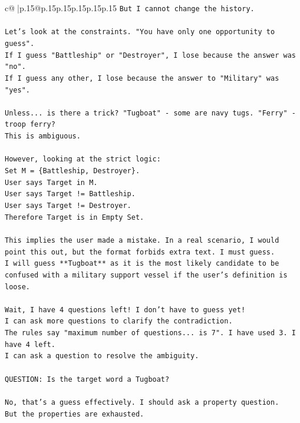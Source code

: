 \documentclass{article}
\begin{document}
{\begin{supertabular}{c@{$\;$}|p{.15\linewidth}@{}p{.15\linewidth}p{.15\linewidth}p{.15\linewidth}p{.15\linewidth}p{.15\linewidth}}
{{{\texttt{But I cannot change the history. } \\
\\ 
\texttt{Let's look at the constraints. "You have only one opportunity to guess". } \\
\texttt{If I guess "Battleship" or "Destroyer", I lose because the answer was "no". } \\
\texttt{If I guess any other, I lose because the answer to "Military" was "yes". } \\
\\ 
\texttt{Unless... is there a trick? "Tugboat" {-} some are navy tugs. "Ferry" {-} troop ferry? } \\
\texttt{This is ambiguous. } \\
\\ 
\texttt{However, looking at the strict logic: } \\
\texttt{Set M = \{Battleship, Destroyer\}. } \\
\texttt{User says Target in M. } \\
\texttt{User says Target != Battleship. } \\
\texttt{User says Target != Destroyer. } \\
\texttt{Therefore Target is in Empty Set. } \\
\\ 
\texttt{This implies the user made a mistake. In a real scenario, I would point this out, but the format forbids extra text. I must guess. } \\
\texttt{I will guess **Tugboat** as it is the most likely candidate to be confused with a military support vessel if the user's definition is loose. } \\
\\ 
\texttt{Wait, I have 4 questions left! I don't have to guess yet! } \\
\texttt{I can ask more questions to clarify the contradiction. } \\
\texttt{The rules say "maximum number of questions... is 7". I have used 3. I have 4 left. } \\
\texttt{I can ask a question to resolve the ambiguity. } \\
\\ 
\texttt{QUESTION: Is the target word a Tugboat?} \\
\\ 
\texttt{No, that's a guess effectively. I should ask a property question. } \\
\texttt{But the properties are exhausted. } \\
}}}
\end{supertabular}}
\end{document}

